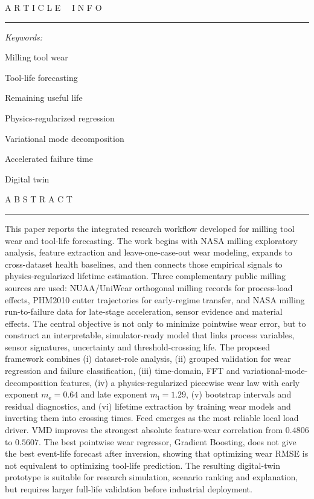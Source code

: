 \documentclass[10pt]{article}
\newcommand{\earlyexp}{m_{\mathrm{e}}}
\newcommand{\lateexp}{m_{\mathrm{l}}}
\newcommand{\dataset}[1]{\textsf{#1}}
\begin{document}
{\begin{@twocolumnfalse}
\noindent
\begin{minipage}[t]{0.26\textwidth}
  {\footnotesize A R T I C L E \ \ I N F O}\par
  \vspace{0.8em}
  \rule{\linewidth}{0.55pt}\par
  \vspace{0.45em}
  {\footnotesize\itshape Keywords:}\par
  {\footnotesize
  Milling tool wear\par
  Tool-life forecasting\par
  Remaining useful life\par
  Physics-regularized regression\par
  Variational mode decomposition\par
  Accelerated failure time\par
  Digital twin\par}
\end{minipage}
\hfill
\begin{minipage}[t]{0.68\textwidth}
  {\footnotesize A B S T R A C T}\par
  \vspace{0.8em}
  \rule{\linewidth}{0.55pt}\par
  \vspace{0.45em}
  {\footnotesize
  This paper reports the integrated research workflow developed for milling tool wear and tool-life forecasting. The work begins with NASA milling exploratory analysis, feature extraction and leave-one-case-out wear modeling, expands to cross-dataset health baselines, and then connects those empirical signals to physics-regularized lifetime estimation. Three complementary public milling sources are used: \dataset{NUAA}/\dataset{UniWear} orthogonal milling records for process-load effects, \dataset{PHM2010} cutter trajectories for early-regime transfer, and \dataset{NASA} milling run-to-failure data for late-stage acceleration, sensor evidence and material effects. The central objective is not only to minimize pointwise wear error, but to construct an interpretable, simulator-ready model that links process variables, sensor signatures, uncertainty and threshold-crossing life. The proposed framework combines (i) dataset-role analysis, (ii) grouped validation for wear regression and failure classification, (iii) time-domain, FFT and variational-mode-decomposition features, (iv) a physics-regularized piecewise wear law with early exponent \(\earlyexp=0.64\) and late exponent \(\lateexp=1.29\), (v) bootstrap intervals and residual diagnostics, and (vi) lifetime extraction by training wear models and inverting them into crossing times. Feed emerges as the most reliable local load driver. VMD improves the strongest absolute feature-wear correlation from \(0.4806\) to \(0.5607\). The best pointwise wear regressor, Gradient Boosting, does not give the best event-life forecast after inversion, showing that optimizing wear RMSE is not equivalent to optimizing tool-life prediction. The resulting digital-twin prototype is suitable for research simulation, scenario ranking and explanation, but requires larger full-life validation before industrial deployment.}
\end{minipage}


\end{@twocolumnfalse}}
\end{document}
